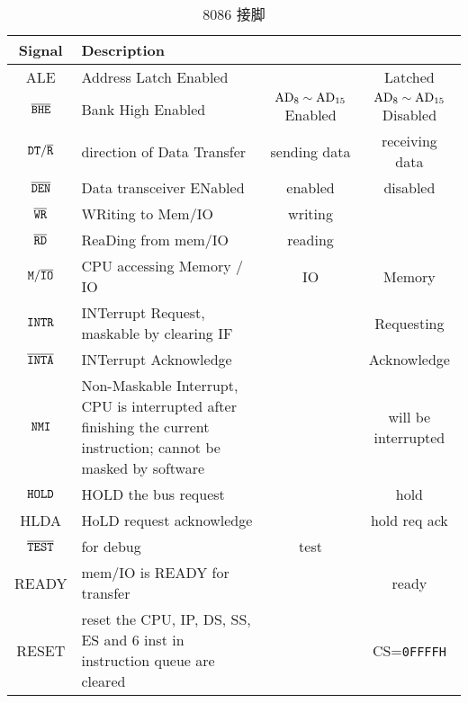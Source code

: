 \begin{table*}
	\centering
	\caption{8086 接脚}
	\begin{tabular}{|>{\ttfamily}c|p{13em}|c|c|}
		\hline
		\bfseries Signal &\bfseries Description &\ttfamily 0 &\ttfamily 1 \\
		\hline
		ALE & Address Latch Enabled &  & Latched  \\
		\hline
		$\tt \overline{BHE}$ & Bank High Enabled & $\rm AD_8\sim \rm AD_{15}$ Enabled & $\rm AD_8\sim\rm AD_{15}$ Disabled \\
		\hline
		$\tt DT/\overline{R}$ & direction of Data Transfer & sending data & receiving data \\
		\hline
		$\tt \overline{DEN}$ & Data transceiver ENabled & enabled & disabled \\
		\hline
		$\tt \overline{WR}$ & WRiting to Mem/IO & writing & \\
		\hline
		$\tt \overline{RD}$ & ReaDing from mem/IO & reading & \\
		\hline
		$\tt M/\overline{IO}$ & CPU accessing Memory / IO & IO & Memory \\
		\hline
		$\tt INTR$ & INTerrupt Request, maskable by clearing IF &  & Requesting \\
		\hline
		$\tt \overline{INTA}$ & INTerrupt Acknowledge &  & Acknowledge \\
		\hline
		$\tt NMI$ & Non-Maskable Interrupt, CPU is interrupted after finishing the current instruction; cannot be masked by software &  & will be interrupted \\
		\hline
		$\tt HOLD$ & HOLD the bus request &  & hold \\
		\hline
		HLDA & HoLD request acknowledge &  & hold req ack \\
		\hline
		$\tt \overline{TEST}$ & for debug & test &  \\
		\hline
		READY & mem/IO is READY for transfer &  & ready \\
		\hline
		RESET & reset the CPU, IP, DS, SS, ES and 6 inst in instruction queue are cleared &  & CS=\texttt{0FFFFH} \\
		\hline
	\end{tabular}
\end{table*}

